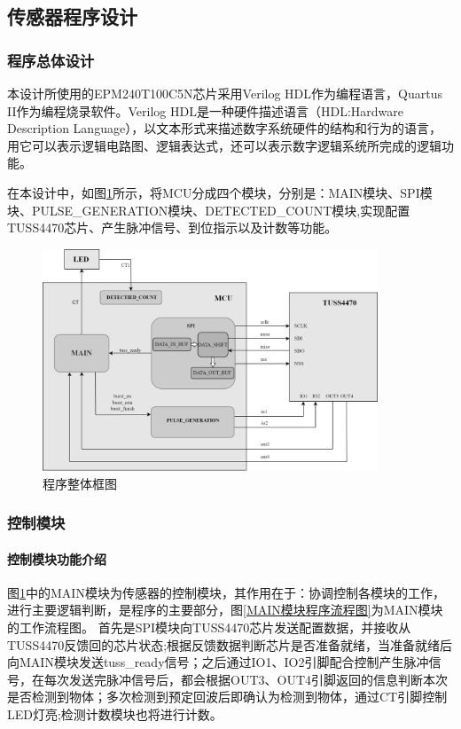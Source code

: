      
    \subsection{传感器程序设计}
    \subsubsection{程序总体设计}
    本设计所使用的EPM240T100C5N芯片采用Verilog HDL作为编程语言，Quartus II作为编程烧录软件。Verilog HDL是一种硬件描述语言（HDL:Hardware Description Language），以文本形式来描述数字系统硬件的结构和行为的语言，用它可以表示逻辑电路图、逻辑表达式，还可以表示数字逻辑系统所完成的逻辑功能。\par
    在本设计中，如图\ref{程序整体框图}所示，将MCU分成四个模块，分别是：MAIN模块、SPI模块、PULSE\_GENERATION模块、DETECTED\_COUNT模块,实现配置TUSS4470芯片、产生脉冲信号、到位指示以及计数等功能。
         \begin{figure}[!h]
        \centering
        \includegraphics[width=10cm]{figure/Overall program block diagram.png}
        \caption{程序整体框图}
        \label{程序整体框图}
    \end{figure}
    \newpage
    \subsubsection{控制模块}
    
    \paragraph{控制模块功能介绍}
    图\ref{程序整体框图}中的MAIN模块为传感器的控制模块，其作用在于：协调控制各模块的工作，进行主要逻辑判断，是程序的主要部分，图\ref{MAIN模块程序流程图}为MAIN模块的工作流程图。
    首先是SPI模块向TUSS4470芯片发送配置数据，并接收从TUSS4470反馈回的芯片状态;根据反馈数据判断芯片是否准备就绪，当准备就绪后向MAIN模块发送tuss\_ready信号；之后通过IO1、IO2引脚配合控制产生脉冲信号，在每次发送完脉冲信号后，都会根据OUT3、OUT4引脚返回的信息判断本次是否检测到物体；多次检测到预定回波后即确认为检测到物体，通过CT引脚控制LED灯亮;检测计数模块也将进行计数。
    

